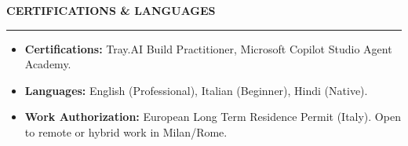 \documentclass[10pt, a4paper]{article}
\begin{document}
\vspace{0.3cm}
\noindent \textbf{CERTIFICATIONS \& LANGUAGES} \\
\noindent\rule{\textwidth}{0.4pt}
\begin{itemize}[leftmargin=0.5cm, nosep]
    \item \textbf{Certifications:} Tray.AI Build Practitioner, Microsoft Copilot Studio Agent Academy.
    \item \textbf{Languages:} English (Professional), Italian (Beginner), Hindi (Native).
    \item \textbf{Work Authorization:} European Long Term Residence Permit (Italy). Open to remote or hybrid work in Milan/Rome.
\end{itemize}
\end{document}
